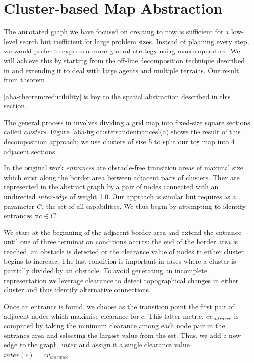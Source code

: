 \section{Cluster-based Map Abstraction}
\label{aha:mapabstraction}
The annotated graph we have focused on creating to now is sufficient for a low-level search but inefficient for large problem sizes. 
Instead of planning every step, we would prefer to express a more general strategy using macro-operators.
We will achieve this by starting from the off-line decomposition technique described in \cite{botea04} and extending it to deal with large agents and multiple terrains. 
Our result from theorem {\ref{aha-theorem:reducibility} is key to the spatial abstraction described in this section. 
\par \indent
The general process in \cite{botea04} involves dividing a grid map into fixed-size square sections called \emph{clusters}. Figure \ref{aha-fig:clustersandentrances}(a) shows the result of this decomposition approach; we use clusters of size 5 to split our toy map into 4 adjacent sections.
\par \indent
In the original work \emph{entrances} are obstacle-free transition areas of maximal size which exist along the border area between adjacent pairs of clusters. 
They are represented in the abstract graph by a pair of nodes connected with an undirected \emph{inter-edge} of weight 1.0. 
Our approach is similar but requires as a parameter $C$, the set of all capabilities. 
We thus begin by attempting to identify entrances $\forall c \in C$. 
\par \indent
We start at the beginning of the adjacent border area and extend the entrance until one of three termination conditions occurs: the end of the border area is reached, an obstacle is detected or the clearance value of nodes in either cluster begins to increase. 
The last condition is important in cases where a cluster is partially divided by an obstacle. 
To avoid generating an incomplete representation we leverage clearance to detect topographical changes in either cluster and thus identify alternative connections.
\par \indent
Once an entrance is found, we choose as the transition point the first pair of adjacent nodes which maximise clearance for $c$. 
This latter metric, $cv_{entrance}$ is computed by taking the minimum clearance among each node pair in the entrance area and selecting the largest value from the set. 
Thus, we add a new edge to the graph, $inter$ and assign it a single clearance value $inter(c) = cv_{entrance}$. 
}
